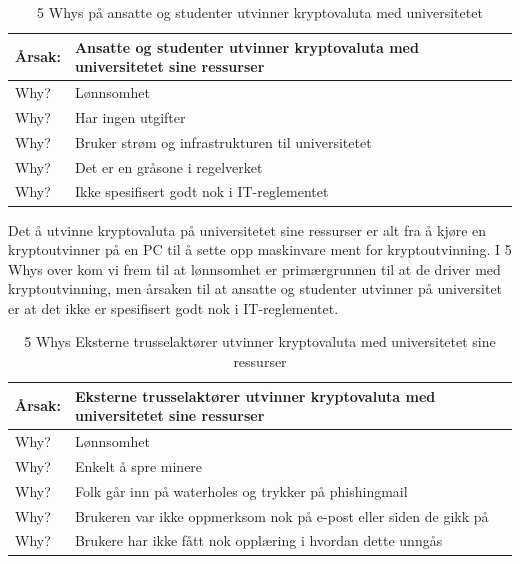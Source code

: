 \begin{table} [H]
    \centering
    \begin{tabular}{ | m{5em} | m{30em} | }
        \hline
            \cellcolor{yellow} Årsak: & \cellcolor{yellow} Ansatte og studenter utvinner kryptovaluta med universitetet sine ressurser                \\
        \hline
            Why? & Lønnsomhet                                    \\
        \hline
            Why? & Har ingen utgifter                                            \\
        \hline
            Why? & Bruker strøm og infrastrukturen til universitetet                \\
        \hline
            Why? & Det er en gråsone i regelverket           \\
        \hline
            Why? & Ikke spesifisert godt nok i IT-reglementet   \\
        \hline
    \end{tabular}
    \caption[5 Whys: Ansatte og studenter utvinner kryptovaluta med universitetet]{5 Whys på ansatte og studenter utvinner kryptovaluta med universitetet}
    \label{5Whys-interne}
\end{table}
Det å utvinne kryptovaluta på universitetet sine ressurser er alt fra å kjøre en kryptoutvinner på en PC til å sette opp maskinvare ment for kryptoutvinning. I 5 Whys over kom vi frem til at lønnsomhet er primærgrunnen til at de driver med kryptoutvinning, men årsaken til at ansatte og studenter utvinner på universitet er at det ikke er spesifisert godt nok i IT-reglementet.   


\begin{table} [H]
    \centering
    \begin{tabular}{ | m{5em} | m{30em} | }
        \hline
            \cellcolor{yellow} Årsak: & \cellcolor{yellow} Eksterne trusselaktører utvinner kryptovaluta med universitetet sine ressurser              \\
        \hline
            Why? & Lønnsomhet                                   \\
        \hline
            Why? & Enkelt å spre minere                                           \\
        \hline
            Why? & Folk går inn på waterholes og trykker på phishingmail               \\
        \hline
            Why? & Brukeren var ikke oppmerksom nok på e-post eller siden de gikk på           \\
        \hline
            Why? & Brukere har ikke fått nok opplæring i hvordan dette unngås    \\
        \hline
    \end{tabular}
    \caption[5 Whys: Eksterne trusselaktører utvinner kryptovaluta med universitetet sine ressurser]{5 Whys Eksterne trusselaktører utvinner kryptovaluta med universitetet sine ressurser}
    \label{5Whys-eksterne}
\end{table}

